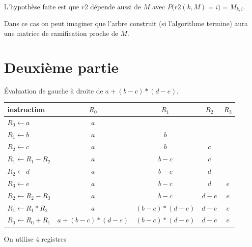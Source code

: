 \begin{Exercise}
L'hypothèse faite est que $r2$ dépende aussi de $M$ avec $P\bigr(r2(k, M) = i\bigl) = M_{k, i}$.

Dans ce cas on peut imaginer que l'arbre construit (si l'algorithme termine) aura une matrice de ramification proche de $M$.
\end{Exercise}
\newpage
\section{Deuxième partie}
\begin{Exercise} Évaluation de gauche à droite de $a+(b-c)*(d-e)$.
  \begin{center}
    \begin{tabular}{l|c|c|c|c}
       instruction&$R_0$&$R_1$&$R_2$&$R_3$ \\
       \hline
       $R_0 \leftarrow a$& $a$&&&\\
       $R_1 \leftarrow b$& $a$&$b$&&\\
       $R_2 \leftarrow c$& $a$&$b$&$c$&\\
       $R_1 \leftarrow R_1-R_2$& $a$&$b-c$&$c$&\\
       $R_2 \leftarrow d$& $a$&$b-c$&$d$&\\
       $R_3 \leftarrow e$& $a$&$b-c$&$d$&$e$\\
       $R_2 \leftarrow R_2-R_3$& $a$&$b-c$&$d-e$&$e$\\
       $R_1 \leftarrow R_1*R_2$& $a$&$(b-c)*(d-e)$&$d-e$&$e$\\
       $R_0 \leftarrow R_0+R_1$& $a+(b-c)*(d-e)$&$(b-c)*(d-e)$&$d-e$&$e$\\
    \end{tabular}
  \end{center}
On utilise 4 registres
\end{Exercise}
